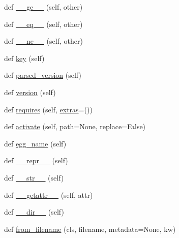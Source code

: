 \begin{DoxyCompactItemize}
\item 
def \hyperlink{classpip_1_1__vendor_1_1pkg__resources_1_1Distribution_ae58105e7ce9cc862aed2570f72e497cf}{\+\_\+\+\_\+ge\+\_\+\+\_\+} (self, other)
\item 
def \hyperlink{classpip_1_1__vendor_1_1pkg__resources_1_1Distribution_a7be392de81a2665336516a38395d9b26}{\+\_\+\+\_\+eq\+\_\+\+\_\+} (self, other)
\item 
def \hyperlink{classpip_1_1__vendor_1_1pkg__resources_1_1Distribution_ad34f21f640c31e8d670372c77a565ba7}{\+\_\+\+\_\+ne\+\_\+\+\_\+} (self, other)
\item 
def \hyperlink{classpip_1_1__vendor_1_1pkg__resources_1_1Distribution_a0e2f9097224488dacdb150539b149888}{key} (self)
\item 
def \hyperlink{classpip_1_1__vendor_1_1pkg__resources_1_1Distribution_acf7530ca3514dd879e0fb6d9b592f3c3}{parsed\+\_\+version} (self)
\item 
def \hyperlink{classpip_1_1__vendor_1_1pkg__resources_1_1Distribution_acd94a7f669ee4fc277245673ea39e748}{version} (self)
\item 
def \hyperlink{classpip_1_1__vendor_1_1pkg__resources_1_1Distribution_afe936526d5ae3f8eef877d6c9e752e44}{requires} (self, \hyperlink{classpip_1_1__vendor_1_1pkg__resources_1_1Distribution_a12c47b7c03dfb6dab9166ca5cb53b464}{extras}=())
\item 
def \hyperlink{classpip_1_1__vendor_1_1pkg__resources_1_1Distribution_a01dcb36642b9cabcedd14c3f50a59657}{activate} (self, path=None, replace=False)
\item 
def \hyperlink{classpip_1_1__vendor_1_1pkg__resources_1_1Distribution_aa61d5600e0896e46b1708c4dcb9393f5}{egg\+\_\+name} (self)
\item 
def \hyperlink{classpip_1_1__vendor_1_1pkg__resources_1_1Distribution_a1fdc23688500c48c58bbaed6a51838aa}{\+\_\+\+\_\+repr\+\_\+\+\_\+} (self)
\item 
def \hyperlink{classpip_1_1__vendor_1_1pkg__resources_1_1Distribution_a367f49337800212249901e1395d78a53}{\+\_\+\+\_\+str\+\_\+\+\_\+} (self)
\item 
def \hyperlink{classpip_1_1__vendor_1_1pkg__resources_1_1Distribution_aff1560d80db2fcc7aae03ffc2dafdc8c}{\+\_\+\+\_\+getattr\+\_\+\+\_\+} (self, attr)
\item 
def \hyperlink{classpip_1_1__vendor_1_1pkg__resources_1_1Distribution_a5999fa7ec4620c76d3dc9239c7902fd3}{\+\_\+\+\_\+dir\+\_\+\+\_\+} (self)
\item 
def \hyperlink{classpip_1_1__vendor_1_1pkg__resources_1_1Distribution_af39faba95ea7360dadc3ac2dfad60c36}{from\+\_\+filename} (cls, filename, metadata=None, kw)

\end{DoxyCompactItemize}
